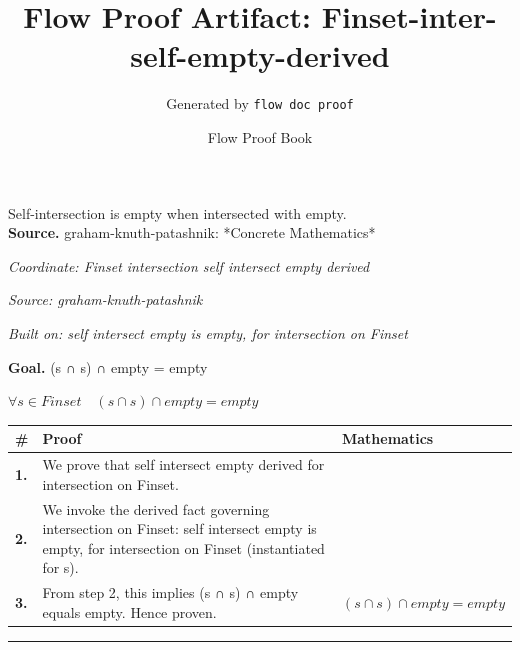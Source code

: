 \documentclass[11pt]{article}
\title{Flow Proof Artifact: Finset-inter-self-empty-derived}
\author{Generated by \texttt{flow doc proof}}
\date{Flow Proof Book}
\theoremstyle{definition}
\begin{document}
\maketitle
Self-intersection is empty when intersected with empty.\\[0.5em]
\textbf{Source.} graham-knuth-patashnik: *Concrete Mathematics*\\[0.5em]
\bigskip
{}\par
\smallskip\noindent\textit{Coordinate: Finset \cdot intersection \cdot self intersect empty derived}\par
\smallskip\noindent\textit{Source: graham-knuth-patashnik}\par
\smallskip\noindent\textit{Built on: self intersect empty is empty, for intersection on Finset}\par
\medskip
\noindent\textbf{Goal.} (s ∩ s) ∩ empty = empty\par
\noindent$\displaystyle \forall s \in Finset\quad (s ∩ s) ∩ empty = empty$\par
\medskip
\noindent
\begin{tabular}{@{} >{\raggedright\arraybackslash}p{} >{\raggedright\arraybackslash}p{} >{\raggedleft\arraybackslash}p{} @{}}
\textbf{\#} & \textbf{Proof} & \textbf{Mathematics} \\
\midrule
\textbf{1.} & We prove that self intersect empty derived for intersection on Finset. & \\[0.45em]
\textbf{2.} & We invoke the derived fact governing intersection on Finset: self intersect empty is empty, for intersection on Finset (instantiated for s). & \\[0.45em]
\textbf{3.} & From step 2, this implies (s ∩ s) ∩ empty equals empty. Hence proven. & $\displaystyle (s ∩ s) ∩ empty = empty$ \\[0.45em]
\bottomrule
\end{tabular}
\label{thm:Finset-intersection-self_intersect_empty_derived}
\par\medskip\hrule
\end{document}
